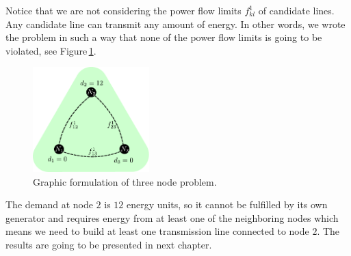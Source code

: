 Notice that we are not considering the power flow limits $f_{kl}^{1}$ of candidate lines. Any candidate line can transmit any amount of energy. In other words, we wrote the problem in such a way that none of the power flow limits is going to be violated, see Figure\,\ref{fig: Green_inital}.
\begin{figure}[H]
  \begin{center}
\includegraphics[width=0.4\textwidth]{Figures/Green_Initial.pdf}
  \end{center}
  \caption{Graphic formulation of three node problem.}
  \label{fig: Green_inital}
\end{figure}
The demand at node $2$ is $12$ energy units, so it cannot be fulfilled by its own generator and requires energy from at least one of the neighboring nodes which means we need to build at least one transmission line connected to node $2$. The results are going to be presented in next chapter.
